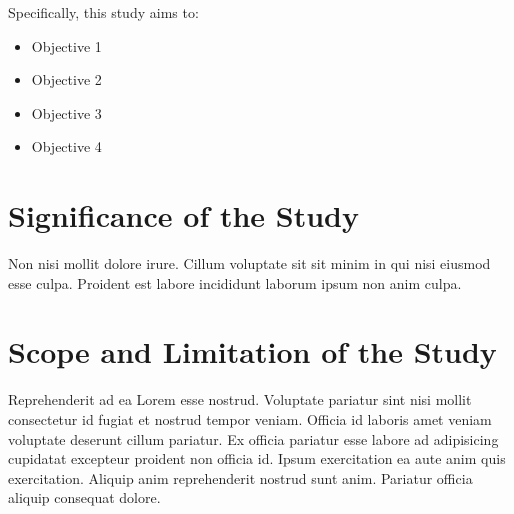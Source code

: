 Specifically, this study aims to:
\begin{itemize}
  \item Objective 1
  \item Objective 2
  \item Objective 3
  \item Objective 4
\end{itemize}

\section{Significance of the Study}

Non nisi mollit dolore irure. Cillum voluptate sit sit minim in qui nisi eiusmod esse culpa. Proident est labore incididunt laborum ipsum non anim culpa.

\section{Scope and Limitation of the Study}

Reprehenderit ad ea Lorem esse nostrud. Voluptate pariatur sint nisi mollit consectetur id fugiat et nostrud tempor veniam. Officia id laboris amet veniam voluptate deserunt cillum pariatur. Ex officia pariatur esse labore ad adipisicing cupidatat excepteur proident non officia id. Ipsum exercitation ea aute anim quis exercitation. Aliquip anim reprehenderit nostrud sunt anim. Pariatur officia aliquip consequat dolore.